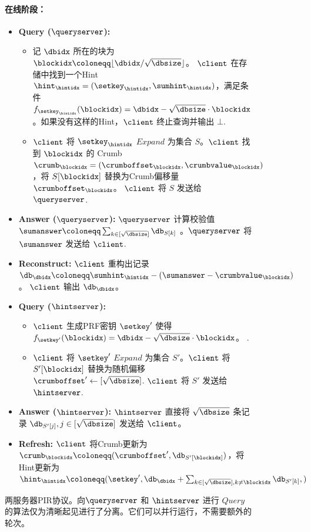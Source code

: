 \begin{figure}
\begin{mdframed}
        \paragraph{在线阶段：}
        \begin{itemize}
            \item \textbf{Query ($\queryserver$):}
                  \begin{itemize}
                      \item 记 $\dbidx$ 所在的块为 $\blockidx\coloneqq \lfloor \dbidx/\sqrt{\dbsize}\rfloor$。 $\client$ 在存储中找到一个Hint $\hint_\hintidx = (\setkey_\hintidx,\sumhint_\hintidx)$，满足条件 $f_{\setkey_\hintidx}(\blockidx) = \dbidx-\sqrt{\dbsize}\cdot \blockidx$。如果没有这样的Hint，$\client$ 终止查询并输出 $\bot$.
                      \item $\client$ 将 $\setkey_\hintidx$ $Expand$ 为集合 $S$。$\client$ 找到 $\blockidx$ 的 Crumb $\crumb_\blockidx=(\crumboffset_\blockidx, \crumbvalue_\blockidx)$，将 $S[\blockidx]$ 替换为Crumb偏移量 $\crumboffset_\blockidx$。  $\client$ 将 $S$  发送给 $\queryserver$.
                  \end{itemize}
            \item \textbf{Answer ($\queryserver$):} $\queryserver$ 计算校验值 $\sumanswer\coloneqq \sum_{k\in [\sqrt{\dbsize}]}\db_{S[k]}$ 。$\queryserver$ 将 $\sumanswer$  发送给 $\client$.
            \item \textbf{Reconstruct:} $\client$ 重构出记录 $\db_\dbidx \coloneqq  \sumhint_\hintidx-(\sumanswer-\crumbvalue_\blockidx)$。  $\client$ 输出 $\db_\dbidx$。
            \item \textbf{Query ($\hintserver$):}
                  \begin{itemize}
                      \item $\client$ 生成PRF密钥 $\setkey'$ 使得 $f_{\setkey'}(\blockidx) = \dbidx-\sqrt{\dbsize}\cdot \blockidx$。 .
                      \item $\client$ 将 $\setkey'$ $Expand$ 为集合 $S'$。$\client$ 将 $S'[\blockidx]$ 替换为随机偏移 $\crumboffset' \leftarrow [\sqrt{\dbsize}]$. $\client$ 将 $S'$ 发送给 $\hintserver$.
                  \end{itemize}
            \item \textbf{Answer ($\hintserver$):} $\hintserver$ 直接将 $\sqrt{\dbsize}$ 条记录 $\db_{S'[j]}, j\in [\sqrt{\dbsize}]$ 发送给 $\client$。
            \item \textbf{Refresh:} $\client$ 将Crumb更新为 $\crumb_\blockidx \coloneqq  (\crumboffset', \db_{S'[\blockidx]})$，将Hint更新为 $\hint_\hintidx \coloneqq  (\setkey',\db_\dbidx + \sum_{k\in [\sqrt{\dbsize}],k\neq \blockidx}\db_{S'[k]}, )$
        \end{itemize}
    \end{mdframed}
    \caption{两服务器PIR协议。向$\queryserver$ 和 $\hintserver$ 进行 $Query$ 的算法仅为清晰起见进行了分离。它们可以并行运行，不需要额外的轮次。}
    \label{fig:two-server}
\end{figure}